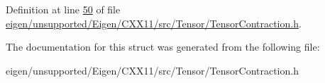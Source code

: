 Definition at line \hyperlink{eigen_2unsupported_2_eigen_2_c_x_x11_2src_2_tensor_2_tensor_contraction_8h_source_l00050}{50} of file \hyperlink{eigen_2unsupported_2_eigen_2_c_x_x11_2src_2_tensor_2_tensor_contraction_8h_source}{eigen/unsupported/\+Eigen/\+C\+X\+X11/src/\+Tensor/\+Tensor\+Contraction.\+h}.



The documentation for this struct was generated from the following file\+:\begin{DoxyCompactItemize}
\item 
eigen/unsupported/\+Eigen/\+C\+X\+X11/src/\+Tensor/\+Tensor\+Contraction.\+h\end{DoxyCompactItemize}
